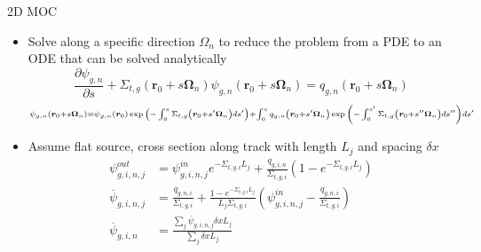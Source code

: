 \begin{frame}[t]{2D MOC}

    \begin{itemize}
      \item Solve along a specific direction $\Omega_n$ to reduce the problem from a PDE to an ODE that can be solved analytically
      \begin{equation*}\scriptstyle
      \frac{\partial \psi_{g,n}}{\partial s} + \Sigma_{t,g}\left(\bm r_0 + 
      s\bm\Omega_n\right)\psi_{g,n}\left(\bm r_0 + s\bm\Omega_n\right) = 
      q_{g,n}\left(\bm r_0 + s\bm\Omega_n\right)
      \end{equation*}
      \begin{dmath*}\scriptstyle
        {\psi_{g,n}\left(\bm r_0 + s\bm\Omega_n\right) = \psi_{g,n}\left(\bm 
        r_0\right)\exp{\left(-\intop_0^s \Sigma_{t,g}\left(\bm r_0 + 
        s'\bm\Omega_n\right)ds'\right)}} + {\intop_0^s q_{g,n}\left(\bm r_0 + 
        s'\bm\Omega_n\right)\exp{\left(-\intop_0^{s'} \Sigma_{t,g}\left(\bm r_0 
        + s''\bm\Omega_n\right)ds''\right)}ds'}
      \end{dmath*}
  \item Assume flat source, cross section along track with 
length $L_j$ and spacing $\delta x$
\begin{align*}\scriptstyle
\psi^{out}_{g,i,n,j} &\scriptstyle = \psi^{in}_{g,i,n,j}e^{-\Sigma_{t,g,i} 
    L_j} + \frac{q_{g,i,n}}{\Sigma_{t,g,i}}\left(1 - 
e^{-\Sigma_{t,g,i}L_j}\right) \\\scriptstyle
\overline{\psi}_{g,i,n,j} &\scriptstyle = 
\frac{q_{g,n,i}}{\Sigma_{t,g,i}} + \frac{1 - e^{-\Sigma_{t,g,i} 
        L_j}}{L_j\Sigma_{t,g,i}}\left(\psi^{in}_{g,i,n,j} - 
\frac{q_{g,n,i}}{\Sigma_{t,g,i}}\right) \\\scriptstyle
\overline{\psi}_{g,i,n} &\scriptstyle = \frac{\sum_j 
    \overline{\psi}_{g,i,n,j} \delta x L_j}{\sum_j \delta x L_j}
\end{align*}
    \end{itemize}

\end{frame} 


